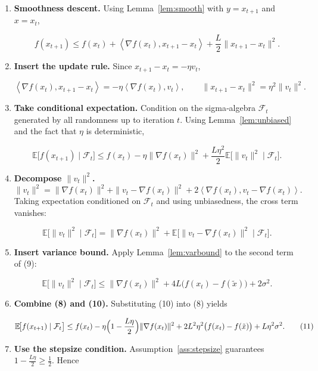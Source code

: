 \documentclass{article}
\newcommand{\E}{\mathbb{E}}
\newcommand{\inner}[2]{\left\langle #1,#2\right\rangle}
\begin{document}
\begin{enumerate}[label=[Step \arabic*], leftmargin=*, nosep]
\item \textbf{Smoothness descent.}  
Using Lemma~\ref{lem:smooth} with \(y=x_{t+1}\) and \(x=x_t\),

\[
f(x_{t+1}) \le f(x_t) + \inner{\nabla f(x_t)}{x_{t+1}-x_t}
               + \frac{L}{2}\|x_{t+1}-x_t\|^{2}.
\tag{6}
\]

\item \textbf{Insert the update rule.}  
Since \(x_{t+1}-x_t = -\eta v_t\),

\[
\inner{\nabla f(x_t)}{x_{t+1}-x_t}= -\eta\inner{\nabla f(x_t)}{v_t},
\qquad
\|x_{t+1}-x_t\|^{2}= \eta^{2}\|v_t\|^{2}.
\tag{7}
\]

\item \textbf{Take conditional expectation.}  
Condition on the sigma‑algebra \(\mathcal{F}_t\) generated by all randomness up to
iteration \(t\).  Using Lemma~\ref{lem:unbiased} and the fact that \(\eta\) is deterministic,

\[
\E\!\bigl[f(x_{t+1})\mid\mathcal{F}_t\bigr]
\le f(x_t) -\eta\|\nabla f(x_t)\|^{2}
   +\frac{L\eta^{2}}{2}\E\!\bigl[\|v_t\|^{2}\mid\mathcal{F}_t\bigr].
\tag{8}
\]

\item \textbf{Decompose \(\|v_t\|^{2}\).}  
\[
\|v_t\|^{2}= \|\nabla f(x_t)\|^{2}
            +\|v_t-\nabla f(x_t)\|^{2}
            +2\inner{\nabla f(x_t)}{v_t-\nabla f(x_t)}.
\]
Taking expectation conditioned on \(\mathcal{F}_t\) and using unbiasedness,
the cross term vanishes:

\[
\E\!\bigl[\|v_t\|^{2}\mid\mathcal{F}_t\bigr]
= \|\nabla f(x_t)\|^{2}
  + \E\!\bigl[\|v_t-\nabla f(x_t)\|^{2}\mid\mathcal{F}_t\bigr].
\tag{9}
\]

\item \textbf{Insert variance bound.}  
Apply Lemma~\ref{lem:varbound} to the second term of (9):

\[
\E\!\bigl[\|v_t\|^{2}\mid\mathcal{F}_t\bigr]
\le \|\nabla f(x_t)\|^{2}
   +4L\bigl(f(x_t)-f(\tilde{x})\bigr)+2\sigma^{2}.
\tag{10}
\]

\item \textbf{Combine (8) and (10).}  
Substituting (10) into (8) yields

\[
\E\!\bigl[f(x_{t+1})\mid\mathcal{F}_t\bigr]
\le f(x_t)
    -\eta\Bigl(1-\frac{L\eta}{2}\Bigr)\|\nabla f(x_t)\|^{2}
    +2L^{2}\eta^{2}\bigl(f(x_t)-f(\tilde{x})\bigr)
    +L\eta^{2}\sigma^{2}.
\tag{11}
\]

\item \textbf{Use the stepsize condition.}  
Assumption~\ref{ass:stepsize} guarantees \(1-\frac{L\eta}{2}\ge\frac12\).  Hence


\end{enumerate}
\end{document}
